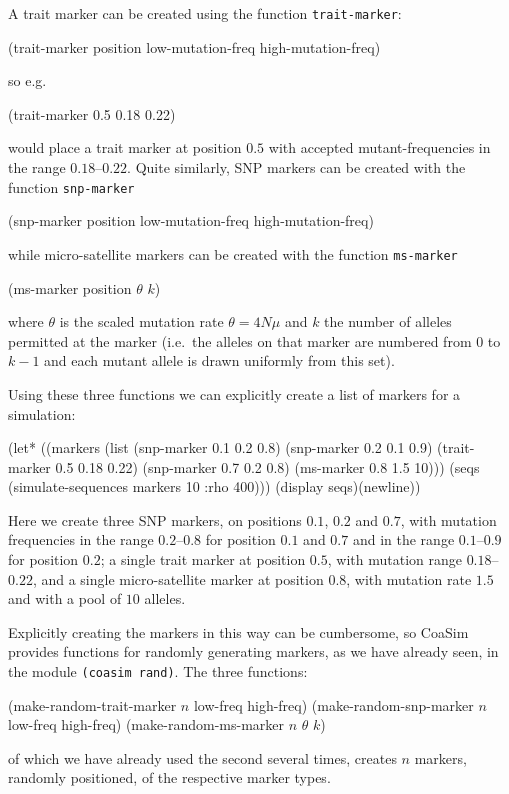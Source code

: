\documentclass{manual}
\begin{document}
A trait marker can be created using the function
\texttt{trait-marker}:
\begin{code}
(trait-marker position low-mutation-freq high-mutation-freq)
\end{code}
so e.g.\
\begin{code}
(trait-marker 0.5 0.18 0.22)
\end{code}
would place a trait marker at position $0.5$ with accepted
mutant-frequencies in the range $0.18$--$0.22$.  Quite similarly, SNP
markers can be created with the function \texttt{snp-marker}
\begin{code}
(snp-marker position low-mutation-freq high-mutation-freq)
\end{code}
while micro-satellite markers can be created with the function
\texttt{ms-marker}
\begin{code}
(ms-marker position \(\theta\) \(k\))
\end{code}
where $\theta$ is the scaled mutation rate $\theta=4N\mu$ and $k$ the
number of alleles permitted at the marker (i.e.\ the alleles on that
marker are numbered from $0$ to $k-1$ and each mutant allele is drawn
uniformly from this set).

Using these three functions we can explicitly create a list of markers
for a simulation:
\begin{code}
(let* ((markers (list (snp-marker   0.1  0.2  0.8)
                      (snp-marker   0.2  0.1  0.9)
                      (trait-marker 0.5  0.18 0.22)
                      (snp-marker   0.7  0.2  0.8)
                      (ms-marker    0.8  1.5  10)))
       (seqs (simulate-sequences markers 10 :rho 400)))
  (display seqs)(newline))
\end{code}

Here we create three SNP markers, on positions $0.1$, $0.2$ and $0.7$,
with mutation frequencies in the range $0.2$--$0.8$ for position
$0.1$ and $0.7$ and in the range $0.1$--$0.9$ for position $0.2$; a
single trait marker at position $0.5$, with mutation range
$0.18$--$0.22$, and a single micro-satellite marker at position $0.8$,
with mutation rate $1.5$ and with a pool of $10$ alleles.

Explicitly creating the markers in this way can be cumbersome, so
CoaSim provides functions for randomly generating markers, as we have
already seen, in the module \texttt{(coasim rand)}.  The three
functions:
\begin{code}
(make-random-trait-marker \(n\) low-freq high-freq)
(make-random-snp-marker   \(n\) low-freq high-freq)
(make-random-ms-marker    \(n\) \(\theta\) \(k\))
\end{code}
of which we have already used the second several times, creates $n$
markers, randomly positioned, of the respective marker types.
\end{document}
